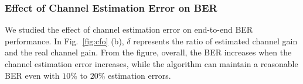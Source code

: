 \subsubsection{Effect of Channel Estimation Error on BER} %
\label{sub:effect_of_channel_estimation}
We studied the effect of channel estimation error %
on end-to-end BER performance. In Fig.~\ref{fig:cfo} (b), $\delta$ represents the ratio of estimated channel gain and the real channel gain. From the figure, 
overall, the BER increases when the channel estimation error increases,  while  the algorithm can maintain a reasonable BER even with $10\%$ to $20\%$
estimation errors. 

